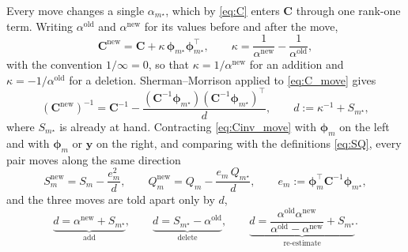 \documentclass[a4paper]{article}
\renewcommand{\vec}[1]{\boldsymbol{#1}}
\begin{document}
Every move changes a single $\alpha_{m^\star}$, which by \eqref{eq:C} enters $\mathbf C$ through one rank-one term. Writing $\alpha^{\mathrm{old}}$ and $\alpha^{\mathrm{new}}$ for its values before and after the move,
\begin{equation} \label{eq:C_move}
    \mathbf C^{\mathrm{new}} = \mathbf C + \kappa \, \vec \phi_{m^\star} \vec \phi_{m^\star}^\top,
    \qquad
    \kappa = \frac{1}{\alpha^{\mathrm{new}}} - \frac{1}{\alpha^{\mathrm{old}}},
\end{equation}
with the convention $1/\infty = 0$, so that $\kappa = 1/\alpha^{\mathrm{new}}$ for an addition and $\kappa = -1/\alpha^{\mathrm{old}}$ for a deletion. Sherman--Morrison applied to \eqref{eq:C_move} gives
\begin{equation} \label{eq:Cinv_move}
    (\mathbf C^{\mathrm{new}})^{-1} = \mathbf C^{-1} - \frac{(\mathbf C^{-1} \vec \phi_{m^\star}) (\mathbf C^{-1} \vec \phi_{m^\star})^\top}{d},
    \qquad
    d := \kappa^{-1} + S_{m^\star},
\end{equation}
where $S_{m^\star}$ is already at hand. Contracting \eqref{eq:Cinv_move} with $\vec \phi_m$ on the left and with $\vec \phi_m$ or $\mathbf y$ on the right, and comparing with the definitions \eqref{eq:SQ}, every pair moves along the same direction
\begin{equation} \label{eq:SQ_update}
    S_m^{\mathrm{new}} = S_m - \frac{e_m^2}{d},
    \qquad
    Q_m^{\mathrm{new}} = Q_m - \frac{e_m \, Q_{m^\star}}{d},
    \qquad
    e_m := \vec \phi_m^\top \mathbf C^{-1} \vec \phi_{m^\star},
\end{equation}
and the three moves are told apart only by $d$,
\begin{equation} \label{eq:d_cases}
    \underbrace{d = \alpha^{\mathrm{new}} + S_{m^\star}}_{\text{add}},
    \qquad
    \underbrace{d = S_{m^\star} - \alpha^{\mathrm{old}}}_{\text{delete}},
    \qquad
    \underbrace{d = \frac{\alpha^{\mathrm{old}} \alpha^{\mathrm{new}}}{\alpha^{\mathrm{old}} - \alpha^{\mathrm{new}}} + S_{m^\star}}_{\text{re-estimate}}.
\end{equation}
\end{document}
